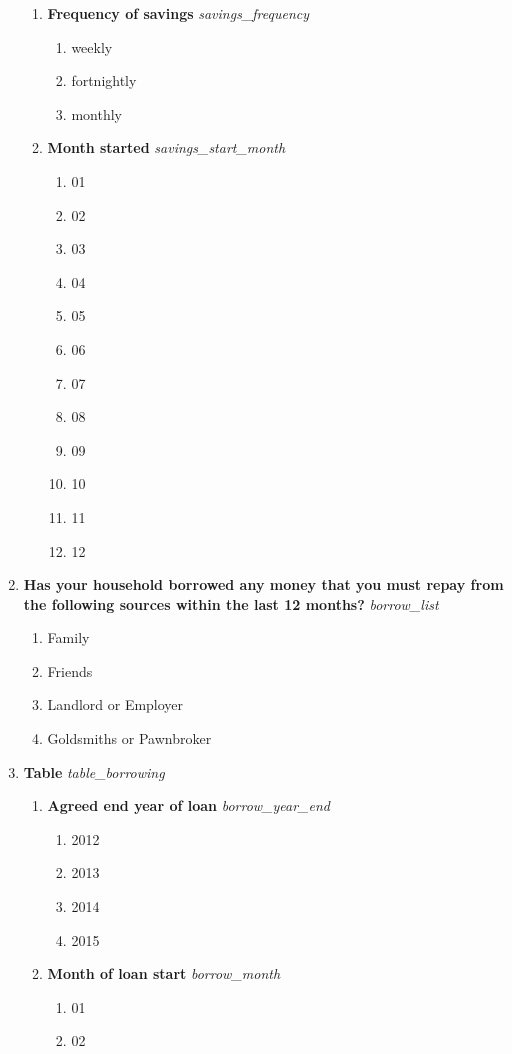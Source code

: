 \documentclass{article}
\begin{document}
\begin{enumerate}
\begin{enumerate}[label*=\arabic*.]
\item {\bfseries Frequency of savings}\emph{ savings\_frequency }
\begin{enumerate}
\item weekly
\item fortnightly
\item monthly
\end{enumerate}
\item {\bfseries Month started}\emph{ savings\_start\_month }
\begin{enumerate}
\item 01
\item 02
\item 03
\item 04
\item 05
\item 06
\item 07
\item 08
\item 09
\item 10
\item 11
\item 12
\end{enumerate}
\end{enumerate}
\item {\bfseries Has your household borrowed any money that you must repay from the following sources within the last 12 months?}\emph{ borrow\_list }
\begin{enumerate}
\item Family
\item Friends
\item Landlord or Employer
\item Goldsmiths or Pawnbroker
\end{enumerate}
\item {\bfseries Table}\emph{ table\_borrowing }
\begin{enumerate}[label*=\arabic*.]
\item {\bfseries Agreed end year of loan}\emph{ borrow\_year\_end }
\begin{enumerate}
\item 2012
\item 2013
\item 2014
\item 2015
\end{enumerate}
\item {\bfseries Month of loan start}\emph{ borrow\_month }
\begin{enumerate}
\item 01
\item 02

\end{enumerate}
\end{enumerate}
\end{enumerate}
\end{document}
